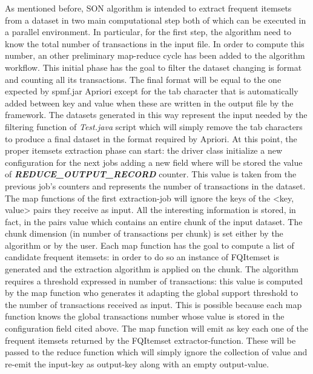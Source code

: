 \documentclass[]{report}
\begin{document}
	As mentioned before, SON algorithm is intended to extract frequent itemsets from a dataset in two main computational step both of which can be executed in a parallel environment. In particular, for the first step, the algorithm need to know the total number of transactions in the input file. In order to compute this number, an other preliminary map-reduce cycle has been added to the algorithm workflow.
	This initial phase has the goal to filter the dataset changing is format and counting all its transactions. The final format will be equal to the one expected by spmf.jar Apriori except for the tab character that is automatically added between key and value when these are written in the output file by the framework. The datasets generated in this way represent the input needed by the filtering function of \textit{Test.java} script which will simply remove the tab characters to produce a final dataset in the format required by Apriori.
	At this point, the proper itemsets extraction phase can start: the driver class initialize a new configuration for the next jobs adding a new field where will be stored the value of \textit{\textbf{REDUCE\_OUTPUT\_RECORD}} counter. This value is taken from the previous job's counters and represents the number of transactions in the dataset. 
	The map functions of the first extraction-job will ignore the keys of the <key, value> pairs they receive as input. All the interesting information is stored, in fact, in the pairs value which contains an entire chunk of the input dataset. The chunk dimension (in number of transactions per chunk) is set either by the algorithm or by the user. Each map function has the goal to compute a list of candidate frequent itemsets: in order to do so an instance of FQItemset is generated and the extraction algorithm is applied on the chunk. The algorithm requires a threshold expressed in number of transactions: this value is computed by the map function who generates it adapting the global support threshold to the number of transactions received as input. This is possible because each map function knows the global transactions number whose value is stored in the configuration field cited above. The map function will emit as key each one of the frequent itemsets returned by the FQItemset extractor-function. These will be passed to the reduce function which will simply ignore the collection of value and re-emit the input-key as output-key along with an empty output-value.
\end{document}
